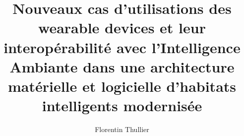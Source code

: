 \documentclass[12pt,times,these,french]{uqac}
\begin{document}
\title{Nouveaux cas d'utilisations des wearable devices et leur interopérabilité avec l’Intelligence Ambiante dans une architecture matérielle et logicielle d'habitats intelligents modernisée}


\author{Florentin Thullier}

\maketitle

\opening


\tableofcontents
\listoftables
\listoffigures
\listofacro


%

\maincontent














%
\end{document}
